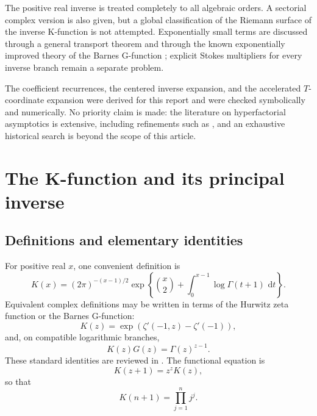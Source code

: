 \documentclass[11pt,a4paper]{article}
\numberwithin{equation}{section}
\theoremstyle{remark}
\newcommand{\dd}{\,\mathrm d}
\begin{document}
The positive real inverse is treated completely to all algebraic orders.  A
sectorial complex version is also given, but a global classification of the
Riemann surface of the inverse K-function is not attempted.  Exponentially
small terms are discussed through a general transport theorem and through the
known exponentially improved theory of the Barnes G-function
\cite{Nemes2014}; explicit Stokes multipliers for every inverse branch remain
a separate problem.

The coefficient recurrences, the centered inverse expansion, and the
accelerated \(T\)-coordinate expansion were derived for this report and were
checked symbolically and numerically.  No priority claim is made: the
literature on hyperfactorial asymptotics is extensive, including refinements
such as \cite{Xu2020}, and an exhaustive historical search is beyond the
scope of this article.

\section{The K-function and its principal inverse}
\label{sec:k-definition}

\subsection{Definitions and elementary identities}

For positive real \(x\), one convenient definition is
\begin{equation}
K(x)=(2\pi)^{-(x-1)/2}
\exp\left\{\binom{x}{2}+
\int_0^{x-1}\log\Gamma(t+1)\,\dd t\right\}.
\label{eq:K-integral-definition}
\end{equation}
Equivalent complex definitions may be written in terms of the Hurwitz zeta
function or the Barnes G-function:
\begin{equation}
K(z)=\exp\!\left(\zeta'(-1,z)-\zeta'(-1)\right),
\label{eq:K-hurwitz}
\end{equation}
and, on compatible logarithmic branches,
\begin{equation}
K(z)G(z)=\Gamma(z)^{z-1}.
\label{eq:K-Barnes-relation}
\end{equation}
These standard identities are reviewed in \cite{KFunctionWiki,DLMFBarnesG}.
The functional equation is
\begin{equation}
K(z+1)=z^zK(z),
\label{eq:K-functional}
\end{equation}
so that
\begin{equation}
K(n+1)=\prod_{j=1}^{n}j^j.
\label{eq:K-integers}
\end{equation}
\end{document}
